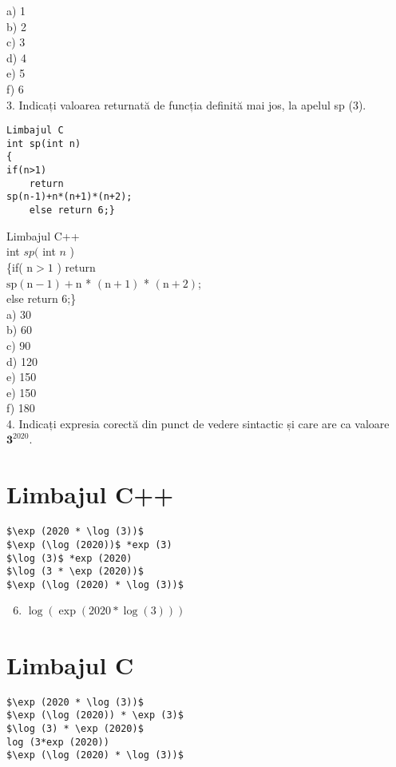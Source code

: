 a) 1\\
b) 2\\
c) 3\\
d) 4\\
e) 5\\
f) 6\\
3. Indicați valoarea returnată de funcția definită mai jos, la apelul sp (3).

\begin{verbatim}
Limbajul C
int sp(int n)
{
if(n>1)
    return
sp(n-1)+n*(n+1)*(n+2);
    else return 6;}
\end{verbatim}

Limbajul C++\\
int $s p($ int $n$ )\\
\{if( $\mathrm{n}>1$ ) return\\
$\mathrm{sp}(\mathrm{n}-1)+\mathrm{n}$ * $(\mathrm{n}+1)$ * $(\mathrm{n}+2)$;\\
else return 6;\}\\
a) 30\\
b) 60\\
c) 90\\
d) 120\\
e) 150\\
e) 150\\
f) 180\\
4. Indicați expresia corectă din punct de vedere sintactic și care are ca valoare $\mathbf{3}^{2020}$.

\section*{Limbajul C++}
\begin{verbatim}
$\exp (2020 * \log (3))$
$\exp (\log (2020))$ *exp (3)
$\log (3)$ *exp (2020)
$\log (3 * \exp (2020))$
$\exp (\log (2020) * \log (3))$
\end{verbatim}

\begin{enumerate}
  \setcounter{enumi}{5}
  \item $\log (\exp (2020 * \log (3)))$
\end{enumerate}

\section*{Limbajul C}
\begin{verbatim}
$\exp (2020 * \log (3))$
$\exp (\log (2020)) * \exp (3)$
$\log (3) * \exp (2020)$
log (3*exp (2020))
$\exp (\log (2020) * \log (3))$
\end{verbatim}


